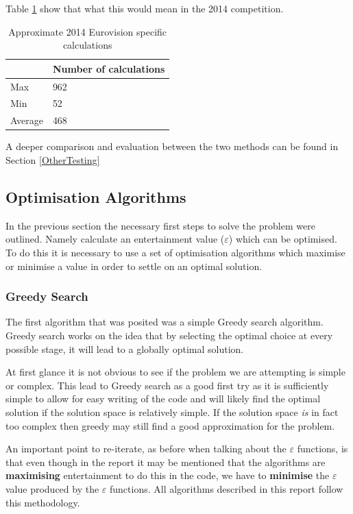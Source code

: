 \documentclass[12pt]{report}
\begin{document}
Table \ref{scoreCalcsAdj2014} show that what this would mean in the 2014 competition.
\begin{table}[H]
\centering
\caption{Approximate 2014 Eurovision specific calculations}
\label{scoreCalcsAdj2014}
\begin{tabular}{|l|l|}
\hline
        & Number of calculations \\ \hline
Max     & 962                    \\ \hline
Min     & 52                     \\ \hline
Average & 468                    \\ \hline
\end{tabular}
\end{table}

A deeper comparison and evaluation between the two methods can be found in Section \ref{OtherTesting}

\subsection{Optimisation Algorithms}\label{Algorithms}
In the previous section the necessary first steps to solve the problem were outlined. Namely calculate an entertainment value ($\varepsilon$) which can be optimised. To do this it is necessary to use a set of optimisation algorithms which maximise or minimise a value in order to settle on an optimal solution.

\subsubsection{Greedy Search}
The first algorithm that was posited was a simple Greedy search algorithm. Greedy search works on the idea that by selecting the optimal choice at every possible stage, it will lead to a globally optimal solution.\cite{GreedySearch}

At first glance it is not obvious to see if the problem we are attempting is simple or complex. This lead to Greedy search as a good first try as it is sufficiently simple to allow for easy writing of the code and will likely find the optimal solution if the solution space is relatively simple. If the solution space \textit{is} in fact too complex then greedy may still find a good approximation for the problem.

An important point to re-iterate, as before when talking about the $\varepsilon$ functions, is that even though in the report it may be mentioned that the algorithms are \textbf{maximising} entertainment to do this in the code, we have to \textbf{minimise} the $\varepsilon$ value produced by the $\varepsilon$ functions. All algorithms described in this report follow this methodology.
\end{document}
